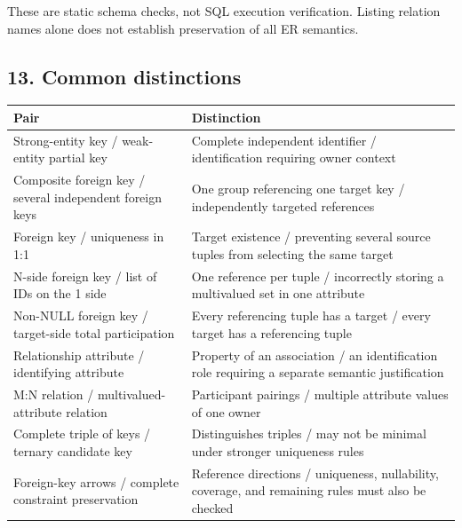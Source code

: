 These are static schema checks, not SQL execution verification. Listing relation names alone does not establish preservation of all ER semantics.

\subsection{13. Common distinctions}\label{04_er_to_relational_mapping_en-common-distinctions}

\begin{longtable}[]{@{}
  >{\raggedright\arraybackslash}p{}
  >{\raggedright\arraybackslash}p{}@{}}
\toprule\noalign{}
\begin{minipage}[b]{\linewidth}\raggedright
Pair
\end{minipage} & \begin{minipage}[b]{\linewidth}\raggedright
Distinction
\end{minipage} \\
\midrule\noalign{}
\endhead
\bottomrule\noalign{}
\endlastfoot
Strong-entity key / weak-entity partial key & Complete independent identifier / identification requiring owner context \\
Composite foreign key / several independent foreign keys & One group referencing one target key / independently targeted references \\
Foreign key / uniqueness in 1:1 & Target existence / preventing several source tuples from selecting the same target \\
N-side foreign key / list of IDs on the 1 side & One reference per tuple / incorrectly storing a multivalued set in one attribute \\
Non-NULL foreign key / target-side total participation & Every referencing tuple has a target / every target has a referencing tuple \\
Relationship attribute / identifying attribute & Property of an association / an identification role requiring a separate semantic justification \\
M:N relation / multivalued-attribute relation & Participant pairings / multiple attribute values of one owner \\
Complete triple of keys / ternary candidate key & Distinguishes triples / may not be minimal under stronger uniqueness rules \\
Foreign-key arrows / complete constraint preservation & Reference directions / uniqueness, nullability, coverage, and remaining rules must also be checked \\
\end{longtable}

